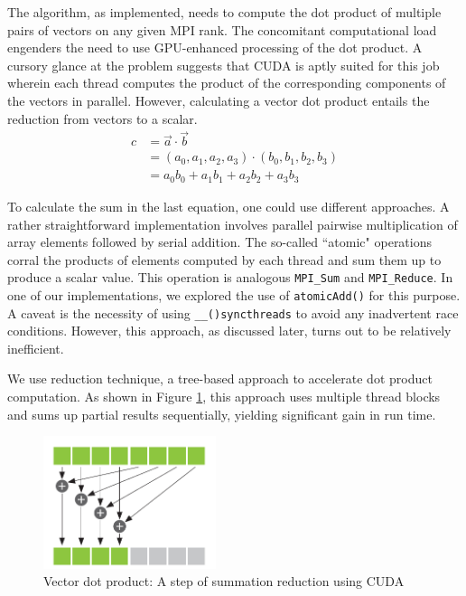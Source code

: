 \documentclass[sigplan,screen]{acmart}
\begin{document}
The algorithm, as implemented, needs to compute the dot product of multiple pairs of vectors on any given MPI rank. The concomitant computational load engenders the need to use GPU-enhanced processing of the dot product. A cursory glance at the problem suggests that CUDA is aptly suited for this job wherein each thread computes the product of the corresponding components of the vectors in parallel. However, calculating a vector dot product entails the reduction from vectors to a scalar.  
\begin{align}
c &= \vec{a} \cdot \vec{b} \\
&= (a_0,a_1,a_2,a_3)\cdot(b_0,b_1,b_2,b_3) \\
&= a_0b_0 + a_1b_1 + a_2b_2 + a_3b_3
\end{align}

To calculate the sum in the last equation, one could use different approaches. A rather straightforward implementation involves parallel pairwise multiplication of array elements followed by serial addition. The so-called ``atomic" operations corral the products of elements computed by each thread and sum them up to produce a scalar value. This operation is analogous {\tt MPI\_Sum} and {\tt MPI\_Reduce}. In one of our implementations, we explored the use of {\tt atomicAdd()} for this purpose. A caveat is the necessity of using {\tt \_\_()syncthreads} to avoid any inadvertent race conditions. However, this approach, as discussed later, turns out to be relatively inefficient. 

We use reduction technique, a tree-based approach to accelerate dot product computation. As shown in Figure \ref{reduce}, this approach uses multiple thread blocks and sums up partial results sequentially, yielding significant gain in run time. 



\begin{figure}[h!]
	\begin{center}
		\includegraphics[width=0.45\textwidth]{reduction.png}
	\end{center}
	\caption{Vector dot product: A step of summation reduction using CUDA \cite{spvm}}
	\label{reduce} 
\end{figure}
\end{document}
